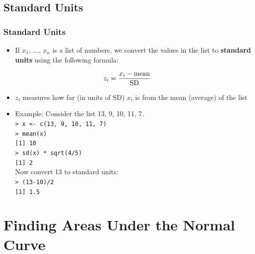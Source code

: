 \documentclass[t]{beamer}
\begin{document}
\subsection{Standard Units}
\begin{frame}[t]\frametitle{Standard Units}
{\small

\begin{itemize}
\item If $x_1$, $\dots$, $x_n$ is a list of numbers, we convert the values
in the list to {\color{blue}\textbf{standard units}} using the following formula:
\vspace{-5pt}
\end{itemize}
\[z_i = \frac{x_i - \mbox{mean}}{\mbox{SD}}\vspace{-12pt}\]
\begin{itemize}
\item $z_i$ measures how far (in units of SD) $x_i$ is from the mean (average) of the list
\item Example:  Consider the list 13, 9, 10, 11, 7.\\
   \texttt{> x <- c(13, 9, 10, 11, 7)}\\
   \texttt{> mean(x)}\\
   \texttt{[1] 10}\\
   \texttt{> sd(x) * sqrt(4/5)}\\
   \texttt{[1] 2}\\[5pt]
   Now convert 13 to standard units:\\
   \texttt{> (13-10)/2}\\
   \texttt{[1] 1.5}\\
\end{itemize}
}

\end{frame}

\section[Areas]{Finding Areas Under the Normal Curve}
\end{document}
